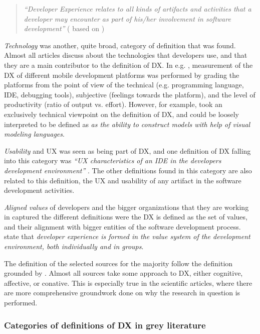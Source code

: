 \documentclass[english, 12pt, a4paper, sci, utf8, a-1b, online]{aaltothesis}
\begin{document}
\begin{quotation}
  \noindent \textit{``Developer Experience relates to all kinds of artifacts and activities that a developer may encounter as part of his/her involvement in software development''} (\textcite{ekwoge2017tester} based on \textcite{fagerholm-dx-concept-and-definition})
\end{quotation}

\noindent \textit{Technology} was another, quite broad, category of definition that was found.  Almost all articles discuss about the technologies that developers use, and that they are a main contributor to the definition of DX. In e.g. \textcite{nebeling2013informing}, measurement of the DX of different mobile development platforms was performed by grading the platforms from the point of view of the technical (e.g. programming language, IDE, debugging tools), subjective (feelings towards the platform), and the level of productivity (ratio of output vs. effort). However, for example, \textcite{silva-comparing} took an exclusively technical viewpoint on the definition of DX, and could be loosely interpreted to be defined as \textit{as the ability to construct models with help of visual modeling languages}.

\textit{Usability} and UX was seen as being part of DX, and one definition of DX falling into this category was \textit{``UX characteristics of an IDE in the developers development environment''} \parencite{software-developers-as-users}. The other definitions found in this category are also related to this definition, the UX and usability of any artifact in the software development activities.

\textit{Aligned values} of developers and the bigger organizations that they are working in captured the different definitions were the DX is defined as the set of values, and their alignment with bigger entities of the software development process. \parencite{fagerholm2014examining} state that \textit{developer experience is formed in the value system of the development environment, both individually and in groups}.

The definition of the selected sources for the majority follow the definition grounded by \textcite{fagerholm-doctoral-thesis}. Almost all sources take some approach to DX, either cognitive, affective, or conative. This is especially true in the scientific articles, where there are more comprehensive groundwork done on why the research in question is performed.

\subsubsection{Categories of definitions of DX in grey literature}
\end{document}
